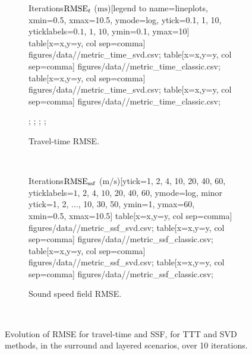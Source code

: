 \begin{figure}
	\centering\setlength{\parindent}{0pt}
	\begin{subfigure}[t]{0.9\linewidth}
		\centering
		{\begin{tikzfig}[0.8\linewidth]
			\begin{lineplot}{Iterations}{$\operatorname{RMSE}_{t}$ ($\si{\milli\second}$)}[legend to name=lineplots, xmin=0.5, xmax=10.5, ymode=log, ytick={0.1, 1, 10}, yticklabels={$0.1$, $1$, $10$}, ymin=0.1, ymax=10]
				{
					\def\sympath{\sympathsurround}
					 table[x=x,y=y, col sep=comma] {figures/data/\sympath/metric_time_svd.csv}; 
					 table[x=x,y=y, col sep=comma] {figures/data/\sympath/metric_time_classic.csv};
				}
				{
					\def\sympath{\sympathlayer}
					 table[x=x,y=y, col sep=comma] {figures/data/\sympath/metric_time_svd.csv}; 
					 table[x=x,y=y, col sep=comma] {figures/data/\sympath/metric_time_classic.csv};
				}
				
				;
				;
				;
				;
			\end{lineplot}
        \end{tikzfig}}
		\caption{Travel-time RMSE.}
		\label{fig:sec4:tt_ssf_rms_errors:subfig1}
	\end{subfigure} \\[0.5cm]
	\begin{subfigure}[t]{0.9\linewidth}
		\centering
		{\begin{tikzfig}[0.8\linewidth]
			\begin{lineplot}{Iterations}{$\operatorname{RMSE}_{\operatorname{ssf}}$ ($\si{\meter/\second}$)}[ytick={1, 2, 4, 10, 20, 40, 60}, yticklabels={$1$, $2$, $4$, $10$, $20$, $40$, $60$}, ymode=log, minor ytick={1, 2, ..., 10, 30, 50}, ymin=1, ymax=60, xmin=0.5, xmax=10.5]
				{
					\def\sympath{\sympathsurround}
					 table[x=x,y=y, col sep=comma] {figures/data/\sympath/metric_ssf_svd.csv}; 
					 table[x=x,y=y, col sep=comma] {figures/data/\sympath/metric_ssf_classic.csv};
				}
				{
					\def\sympath{\sympathlayer}
					 table[x=x,y=y, col sep=comma] {figures/data/\sympath/metric_ssf_svd.csv}; 
					 table[x=x,y=y, col sep=comma] {figures/data/\sympath/metric_ssf_classic.csv};
				}
			\end{lineplot}
        \end{tikzfig}}
		\caption{Sound speed field RMSE.}
		\label{fig:sec4:tt_ssf_rms_errors:subfig2}
	\end{subfigure}
	\\[1em]
    
	\caption{Evolution of RMSE for travel-time and SSF, for TTT and SVD methods, in the surround and layered scenarios, over 10 iterations.}
	\label{fig:sec4:tt_ssf_rms_errors}
\end{figure}